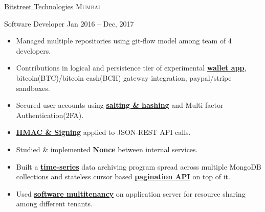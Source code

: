 \documentclass[11pt,a4paper]{article}
\begin{document}



\headedsection
  {\href{http://bitstreet.in/}{Bitstreet Technologies}}
  {\textsc{Mumbai}}
  {%
    \headedsubsection
    {Software Developer}
    {Jan 2016 -- Dec, 2017}
    {
      \begin{itemize}
        \item Managed multiple repositories using git-flow model among team of 4 developers.
        \item Contributions in logical and persistence tier of experimental \href{https://rihbyne.github.io/diy/digital-wallet/}{\textbf{wallet app}}, bitcoin(BTC)/bitcoin cash(BCH) gateway integration, paypal/stripe sandboxes.
        \item Secured user accounts using \href{https://rihbyne.github.io/blog/user-auth/}{\textbf{salting \& hashing}} and Multi-factor Authentication(2FA).
        \item \href{https://rihbyne.github.io/blog/hmac-authentication/}{\textbf{HMAC \& Signing}} applied to JSON-REST API calls.
        \item Studied \& implemented \href{https://rihbyne.github.io/diy/nonce-auth-systems/}{\textbf{Nonce}} between internal services.
        \item Built a \href{https://rihbyne.github.io/diy/notification-core/}{\textbf{time-series}} data archiving program spread across multiple MongoDB collections and stateless cursor based \href{https://rihbyne.github.io/diy/stateless-pagination/}{\textbf{pagination API}} on top of it.
        \item Used \href{https://rihbyne.github.io/diy/multi-tenancy/}{\textbf{software multitenancy}} on application server for resource sharing among different tenants.
      \end{itemize}
    }
  }
\end{document}
